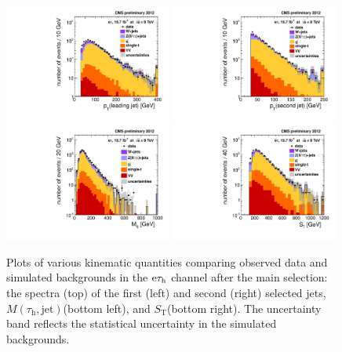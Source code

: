 \documentclass[12pt]{thesis}  %
\newcommand{\tauh}{\ensuremath{\tau_{\text{h}}}\xspace}
\newcommand{\Pe}{\ensuremath{\cmsSymbolFace{e}}\xspace}
\newcommand{\etau}{\ensuremath{\Pe\tauh}\xspace}
\def\ST{\ensuremath{S_{\text{T}}}\xspace}
\def\MassTJ{\ensuremath{M(\tauh,\text{jet})}\xspace}
\begin{document}
\begin{figure}[hbtp]
  \begin{center}
    \includegraphics[width=0.49\textwidth]{figures/etau/jet1PtBTag.pdf}
    \includegraphics[width=0.49\textwidth]{figures/etau/jet2PtBTag.pdf} \\
    \includegraphics[width=0.49\textwidth]{figures/etau/finalMass.pdf}
    \includegraphics[width=0.49\textwidth]{figures/etau/STbjetBTag.pdf}
    \caption{Plots of various kinematic quantities comparing observed data and simulated backgrounds in the \etau channel after the main selection: the \pt spectra (top) of the first (left) and second (right) selected jets, \MassTJ (bottom left), and \ST (bottom right). The uncertainty band reflects the statistical uncertainty in the simulated backgrounds.}
    \label{fig:mainseletau}
  \end{center}
\end{figure}
\end{document}
